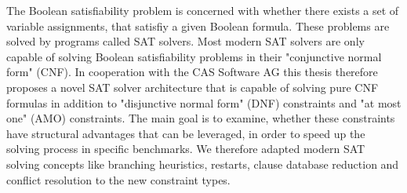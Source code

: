 
\Abstract

The Boolean satisfiability problem is concerned with whether there exists a set of variable assignments, that satisfiy a given Boolean formula. These problems are solved by programs called SAT solvers. Most modern SAT solvers are only capable of solving Boolean satisfiability problems in their "conjunctive normal form" (CNF). In cooperation with the CAS Software AG this thesis therefore proposes a novel SAT solver architecture that is capable of solving pure CNF formulas in addition to "disjunctive normal form" (DNF) constraints and "at most one" (AMO) constraints. The main goal is to examine, whether these constraints have structural advantages that can be leveraged, in order to speed up the solving process in specific benchmarks. We therefore adapted modern SAT solving concepts like branching heuristics, restarts, clause database reduction and conflict resolution to the new constraint types.